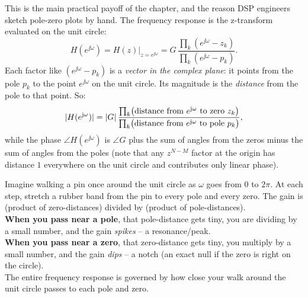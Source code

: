 This is the main practical payoff of the chapter, and the reason DSP engineers
sketch pole-zero plots by hand. The frequency response is the z-transform
evaluated on the unit circle:
\[
  H(e^{\jj\omega}) = H(z)\big|_{z=e^{\jj\omega}}
  = G\,\frac{\prod_k (e^{\jj\omega}-z_k)}{\prod_k (e^{\jj\omega}-p_k)}.
\]
Each factor like $(e^{\jj\omega}-p_k)$ is a \emph{vector in the complex plane}: it points
from the pole $p_k$ to the point $e^{\jj\omega}$ on the unit circle. Its magnitude is the
\emph{distance} from the pole to that point. So:
\[
  \lvert H(e^{\mathrm{j}\omega})\rvert
  = \lvert G\rvert\,\frac{\prod_k \bigl(\text{distance from } e^{\mathrm{j}\omega} \text{ to zero } z_k\bigr)}
                  {\prod_k \bigl(\text{distance from } e^{\mathrm{j}\omega} \text{ to pole } p_k\bigr)},
\]
while the phase $\angle H(e^{\jj\omega})$ is $\angle G$ plus the sum of angles from the zeros minus the sum of angles from the poles (note that any $z^{N-M}$ factor at the origin has distance $1$ everywhere on the unit circle and contributes only linear phase).

\begin{happeningbox}
Imagine walking a pin once around the unit circle as $\omega$ goes from $0$ to $2\pi$. At
each step, stretch a rubber band from the pin to every pole and every zero. The gain is
(product of zero-distances) divided by (product of pole-distances). \\[0.3em]
\textbf{When you pass near a pole}, that pole-distance gets tiny, you are dividing by a
small number, and the gain \emph{spikes} -- a resonance/peak. \\[0.3em]
\textbf{When you pass near a zero}, that zero-distance gets tiny, you multiply by a small
number, and the gain \emph{dips} -- a notch (an exact null if the zero is right on the
circle). \\[0.3em]
The entire frequency response is governed by how close your walk around the unit circle
passes to each pole and zero.
\end{happeningbox}


